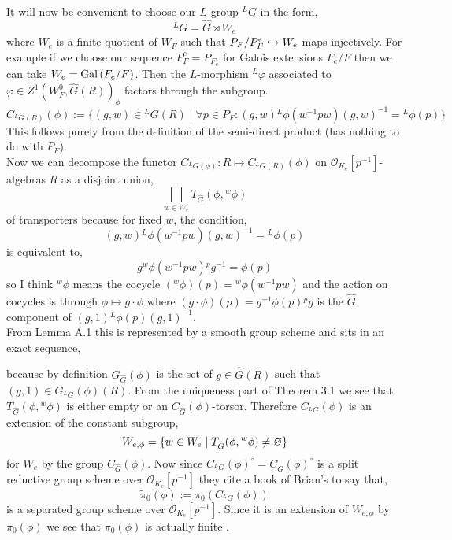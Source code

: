 \documentclass[12pt]{article}
\newcommand{\LG}{{}^L G}
\newcommand{\ok}{\mathcal{O}_{K_e}}
\begin{document}
It will now be convenient to choose our $L$-group $\LG$ in the form,
\[ \LG = \hat{G} \rtimes W_e \]
where $W_e$ is a finite quotient of $W_F$ such that $P_F / P_F^e \hookrightarrow W_e$ maps injectively. For example if we choose our sequence $P_F^e = P_{F_e}$ for Galois extensions $F_e / F$ then we can take $W_e = \mathrm{Gal}\left( F_e/F \right)$. Then the $L$-morphism ${}^L \varphi$ associated to $\varphi \in Z^1(W_F^0, \hat{G}(R))_\phi$ factors through the subgroup.
\[ C_{\LG(R)}(\phi) := \{ (g,w) \in \LG(R) \mid \forall p \in P_F : (g,w) {}^L \phi(w^{-1} p w) (g, w)^{-1} = {}^L \phi(p) \} \]
This follows purely from the definition of the semi-direct product (has nothing to do with $P_F$). 
\bigskip\\
Now we can decompose the functor $C_{\LG(\phi)} : R \mapsto C_{\LG(R)}(\phi)$ on $\ok[p^{-1}]$-algebras $R$ as a disjoint union,
\[ \bigsqcup_{w \in W_e} T_{\hat{G}}(\phi, {}^w \phi) \]
of transporters because for fixed $w$, the condition,
\[ (g,w) {}^L \phi(w^{-1} p w) (g,w)^{-1} = {}^L \phi(p) \]
is equivalent to,
\[ g {}^w \phi(w^{-1} p w) {}^p g^{-1} = \phi(p) \]
so I think ${}^w \phi$ means the cocycle $({}^w \phi)(p) = {}^w \phi(w^{-1} p w)$ and the action on cocycles is through $\phi \mapsto g \cdot \phi$ where $(g \cdot \phi)(p) = g^{-1} \phi(p) {}^p g$ is the $\hat{G}$ component of $(g,1) {}^L \phi(p) (g,1)^{-1}$.
\bigskip\\
From Lemma A.1 this is represented by a smooth group scheme and sits in an exact sequence,
\begin{center}
\end{center}
because by definition $G_{\hat{G}}(\phi)$ is the set of $g \in \hat{G}(R)$ such that $(g,1) \in G_{\LG}(\phi)(R)$. From the uniqueness part of Theorem 3.1 we see that $T_{\hat{G}}(\phi, {}^w \phi)$ is either empty or an \etale $C_{\hat{G}}(\phi)$-torsor. Therefore $C_{\LG}(\phi)$ is an extension of the constant subgroup,
\[ W_{e, \phi} = \{ w \in W_e \mid T_{\hat{G}}(\phi, {}^w \phi) \neq \varnothing \} \]
for $W_e$ by the group $C_{\hat{G}}(\phi)$. Now since $C_{\LG}(\phi)^\circ = C_{\hat{G}}(\phi)^\circ$ is a split reductive group scheme over $\ok[p^{-1}]$ they cite a book of Brian's to say that,
\[ \tilde{\pi}_0(\phi) := \pi_0(C_{\LG}(\phi)) \]
is a separated \etale group scheme over $\ok[p^{-1}]$. Since it is an extension of $W_{e, \phi}$ by $\pi_0(\phi)$ we see that $\tilde{\pi}_0(\phi)$ is actually finite \etale.
\end{document}
